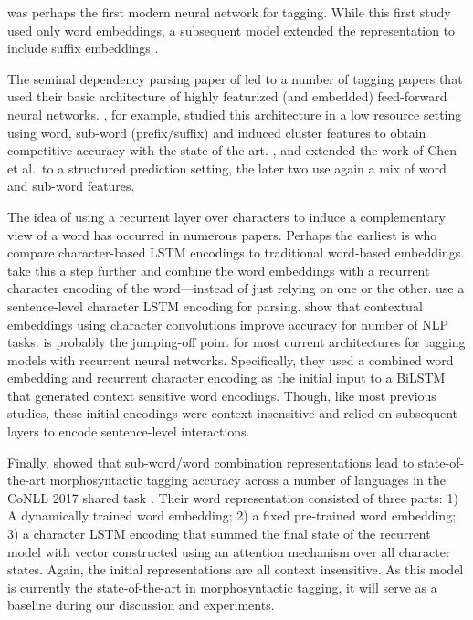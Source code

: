 \documentclass[11pt,a4paper]{article}
\begin{document}
 was perhaps the first modern neural network for tagging. While this first study used only word embeddings, a subsequent model extended the representation to include suffix embeddings \cite{collobert2011natural}.

The seminal dependency parsing paper of  led to a number of tagging papers that used their basic architecture of highly featurized (and embedded) feed-forward neural networks. , for example, studied this architecture in a low resource setting using word, sub-word (prefix/suffix) and induced cluster features to obtain competitive accuracy with the state-of-the-art. ,  and  extended the work of Chen et al.\  to a structured prediction setting, the later two use again a mix of word and sub-word features.

The idea of using a recurrent layer over characters to induce a complementary view of a word has occurred in numerous papers. Perhaps the earliest is  who compare character-based LSTM encodings to traditional word-based embeddings.  take this a step further and combine the word embeddings with a recurrent character encoding of the word---instead of just relying on one or the other.  use a sentence-level character LSTM encoding for parsing.  show that contextual embeddings using character convolutions improve accuracy for number of NLP tasks.
 is probably the jumping-off point for most current architectures for tagging models with recurrent neural networks. Specifically, they used a combined word embedding and recurrent character encoding as the initial input to a BiLSTM that generated context sensitive word encodings. Though, like most previous studies, these initial encodings were context insensitive and relied on subsequent layers to encode sentence-level interactions.

Finally,  showed that sub-word/word combination representations lead to state-of-the-art morphosyntactic tagging accuracy across a number of languages in the CoNLL 2017 shared task \cite{zeman-EtAl:2017:K17-3}. Their word representation consisted of three parts: 1) A dynamically trained word embedding; 2) a fixed pre-trained word embedding; 3) a character LSTM encoding that summed the final state of the recurrent model with vector constructed using an attention mechanism over all character states. Again, the initial representations are all context insensitive. As this model is currently the state-of-the-art in morphosyntactic tagging, it will serve as a baseline during our discussion and experiments.
\end{document}
